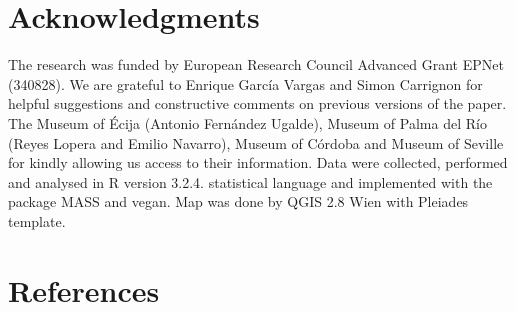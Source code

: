 \documentclass[review]{elsarticle}
\begin{document}
\section{Acknowledgments}

The research was funded by European Research Council Advanced Grant EPNet (340828). We are grateful to Enrique Garc\'ia Vargas and Simon Carrignon for helpful suggestions and constructive comments on previous versions of the paper. The Museum of \'Ecija (Antonio Fern\'andez Ugalde), Museum of Palma del R\'io (Reyes Lopera and Emilio Navarro), Museum of C\'ordoba and Museum of Seville for kindly allowing us access to their information.  
Data were collected, performed and analysed in R version 3.2.4. statistical language and implemented with the package MASS and vegan. Map was done by QGIS 2.8 Wien with Pleiades template. 



\section*{References}

%

\end{document}
